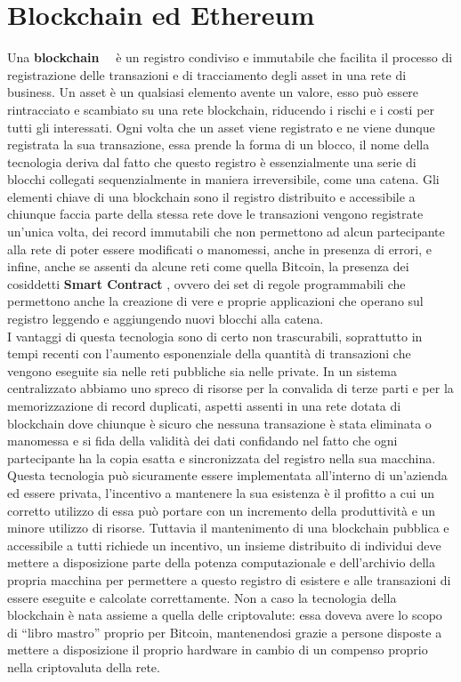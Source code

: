 \section{Blockchain ed Ethereum}
\label{sub:bc}
Una \textbf{blockchain}~\cite{block1}~\cite{block2} è un registro condiviso e immutabile che facilita il processo di registrazione
delle transazioni e di tracciamento degli asset in una rete di business. Un asset è un qualsiasi
elemento avente un valore, esso può essere rintracciato e scambiato su una rete blockchain,
riducendo i rischi e i costi per tutti gli interessati. Ogni volta che un asset viene registrato e
ne viene dunque registrata la sua transazione, essa prende la forma di un blocco,
il nome della tecnologia deriva dal fatto che questo registro è essenzialmente una serie di blocchi
collegati sequenzialmente in maniera irreversibile, come una catena.
Gli elementi chiave di una blockchain sono il registro distribuito e accessibile a chiunque faccia
parte della stessa rete dove le transazioni vengono registrate un’unica volta, dei record immutabili
che non permettono ad alcun partecipante alla rete di poter essere modificati o manomessi,
anche in presenza di errori, e infine, anche se assenti da alcune reti come quella Bitcoin,
la presenza dei cosiddetti \textbf{Smart Contract} \label{sub:smp}, ovvero dei set di regole programmabili che permettono
anche la creazione di vere e proprie applicazioni che operano
sul registro leggendo e aggiungendo nuovi blocchi alla catena. \\
I vantaggi di questa tecnologia sono di certo non trascurabili, soprattutto in tempi
recenti con l’aumento esponenziale della quantità di transazioni che vengono eseguite
sia nelle reti pubbliche sia nelle private.
In un sistema centralizzato abbiamo uno spreco di risorse per la convalida di terze parti
e per la memorizzazione di record duplicati, aspetti assenti in una rete dotata di blockchain
dove chiunque è sicuro che nessuna transazione è stata eliminata o manomessa e si fida della
validità dei dati confidando nel fatto che ogni partecipante ha la copia esatta e sincronizzata
del registro nella sua macchina.
Questa tecnologia può sicuramente essere implementata all’interno di un’azienda ed essere privata,
l’incentivo a mantenere la sua esistenza è il profitto a cui un corretto utilizzo di essa può portare
con un incremento della produttività e un minore utilizzo di risorse.
Tuttavia il mantenimento di una blockchain pubblica e accessibile a tutti richiede un incentivo,
un insieme distribuito di individui deve mettere a disposizione parte della potenza computazionale
e dell’archivio della propria macchina per permettere a questo registro di esistere
e alle transazioni di essere eseguite e calcolate correttamente.
Non a caso la tecnologia della blockchain è nata assieme a quella delle criptovalute:
essa doveva avere lo scopo di “libro mastro” proprio per Bitcoin, mantenendosi grazie a persone
disposte a mettere a disposizione il proprio hardware in cambio di un compenso
proprio  nella criptovaluta della rete.


